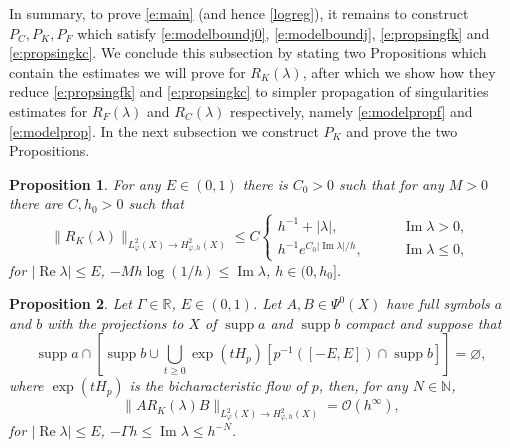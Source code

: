 \documentclass[reqno, 12pt]{amsart}
\newcommand \N {\mathbb{N}}
\newcommand \R {\mathbb{R}}
\newcommand \Oh {\mathcal{O}}
\DeclareMathOperator \re {Re}
\DeclareMathOperator \im {Im}
\DeclareMathOperator \supp {supp}
\newtheorem{prop}{Proposition}
\theoremstyle{definition}
\numberwithin{equation}{section}
\numberwithin{prop}{section}
\numberwithin{figure}{section}
\begin{document}
In summary, to prove \eqref{e:main} (and hence \eqref{logreg}), it remains to construct $P_C,P_K,P_F$ which satisfy \eqref{e:modelboundj0}, \eqref{e:modelboundj}, \eqref{e:propsingfk} and \eqref{e:propsingkc}.
We conclude this subsection by stating two Propositions which contain the estimates we will prove for $R_K(\lambda)$, after which we show how they reduce \eqref{e:propsingfk} and \eqref{e:propsingkc} to simpler propagation of singularities estimates for  $R_F(\lambda)$ and $R_C(\lambda)$ respectively, namely \eqref{e:modelpropf} and \eqref{e:modelprop}. In the next subsection we construct $P_K$ and prove the two Propositions.

\begin{prop}\label{p:rkbound}
For any $E \in (0,1)$ there is $C_0>0$ such that for any $M>0$ there are $C,h_0>0$ such that
\begin{equation}\label{e:rkbound}
\|R_K(\lambda)\|_{L^2_\varphi(X) \to H^2_{\varphi,h}(X)} \le C
\begin{cases}
h^{-1} + |\lambda|, \qquad & \im \lambda > 0, \\
h^{-1} e^{C_0 |\im \lambda|/h}, \qquad &\im \lambda \le 0,
\end{cases}
\end{equation}
for $|\re \lambda| \le E$,  $- Mh\log(1/h) \le \im \lambda $, $h \in (0,h_0]$.
\end{prop}

\begin{prop}\label{p:rkprop}
Let $\Gamma \in \R$, $E \in (0,1)$.  Let $A,B \in \Psi^0(X)$ have full symbols $a$ and $b$ with the projections to $X$ of $\supp a$ and $\supp b$  compact and suppose that 
\begin{equation}\label{e:rkpropdyn}
\supp a \cap \left[\supp b \cup \bigcup_{t \ge 0} \exp(tH_p) \left[ p^{-1}([-E,E]) \cap \supp b\right]\right] = \varnothing,
\end{equation}
where $\exp(tH_p)$ is the bicharacteristic flow of $p$, then,  for any $N \in \N$,
\begin{equation}\label{e:rkprop}
\|AR_K(\lambda)B\|_{L^2_\varphi(X) \to H^2_{\varphi,h}(X)} = \Oh(h^\infty),
\end{equation}
for  $|\re \lambda| \le E$, $ -\Gamma h \le \im \lambda \le h^{-N}$.
\end{prop}
\end{document}
